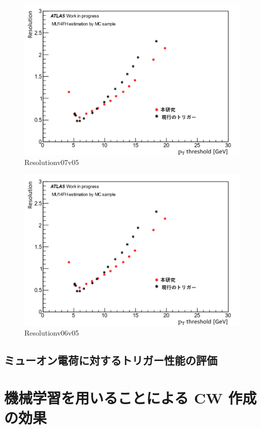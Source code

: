 \begin{figure}[tb]
  \centering
  \includegraphics[clip, width=12cm]{fig/4/resolution_v07_v05.png}
  \caption{Resolutionv07v05}
  \label{fig:Resolution_v07v05}
\end{figure}

\begin{figure}[tb]
  \centering
  \includegraphics[clip, width=12cm]{fig/4/resolution_v07_v05.png}
  \caption{Resolutionv06v05}
  \label{fig:Resolution_v06v05}
\end{figure}

\subsection{ミューオン電荷に対するトリガー性能の評価}



\section{機械学習を用いることによる CW 作成の効果}
